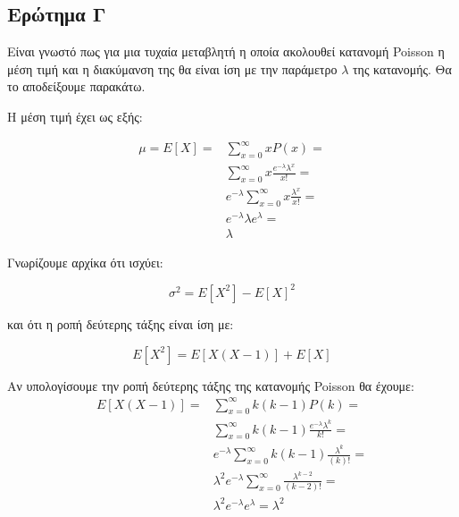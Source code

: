 \documentclass[12pt]{article}
\begin{document}
\subsection{Ερώτημα Γ}
Είναι γνωστό πως για μια τυχαία μεταβλητή η οποία ακολουθεί κατανομή Poisson η μέση τιμή 
και η διακύμανση της θα είναι ίση με την παράμετρο $\lambda$ της κατανομής. Θα το αποδείξουμε 
παρακάτω.

Η μέση τιμή έχει ως εξής:

\begin{equation}
    \begin{split}
        \mu = E[X] = & \sum_{x=0}^{\infty} x P(x) = \\
        & \sum_{x=0}^{\infty} x \frac{e^{-\lambda} \lambda^x}{x!} = \\
        & e^{-\lambda} \sum_{x=0}^{\infty} x \frac{\lambda^x}{x!} = \\
        & e^{-\lambda} \lambda e^{\lambda} = \\
        & \lambda
    \end{split}
\end{equation}

Γνωρίζουμε αρχίκα ότι ισχύει:

\begin{center}
    \begin{equation}
        \sigma^2 = E[X^2] - E[X]^2
    \end{equation}
\end{center}

και ότι η ροπή δεύτερης τάξης είναι ίση με:

\begin{center}
    \begin{equation}
        Ε[X^2] = E[X(X-1)] + E[X]
    \end{equation}
\end{center}

Αν υπολογίσουμε την ροπή δεύτερης τάξης της κατανομής Poisson θα έχουμε:\\

\begin{equation}
    \begin{split}
    E[X(X-1)] =
    & \sum_{x=0}^{\infty} k(k-1) P(k) = \\
    & \sum_{x=0}^{\infty} k(k-1) \frac{e^{-\lambda} \lambda^k}{k!} = \\
    & e^{-\lambda} \sum_{x=0}^{\infty} k(k-1) \frac{\lambda^k}{(k)!} = \\
    & \lambda^2 e^{-\lambda} \sum_{x=0}^{\infty} \frac{\lambda^{k-2}}{(k-2)!} = \\
    & \lambda^2 e^{-\lambda} e^{\lambda} = \lambda^2
    \end{split}
\end{equation}
\end{document}
